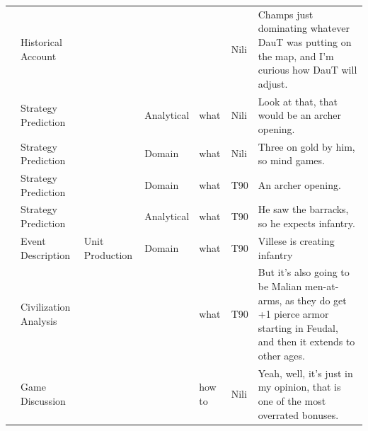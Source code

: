 {\begin{longtable}{@{}>{\theAppRow}r|L{2.3cm}L{2.2cm}L{1.4cm}L{2.2cm}L{0.5cm}U{5.6cm}@{}}
    & Historical Account    &                      &             &                   & Nili    & Champs just dominating whatever DauT was putting on the map, and I'm curious how DauT will adjust.                                                                                                                       \\
    & Strategy Prediction   &                      & Analytical  & what              & Nili    & Look at that, that would be an archer opening.                                                                                                                                                                           \\
    & Strategy Prediction   &                      & Domain      & what              & Nili    & Three on gold by him, so mind games.                                                                                                                                                                                     \\
    & Strategy Prediction   &                      & Domain      & what              & T90     & An archer opening.                                                                                                                                                                                                       \\
    & Strategy Prediction   &                      & Analytical  & what              & T90     & He saw the barracks, so he expects infantry.                                                                                                                                                                             \\
    & Event Description     & Unit Production      & Domain      & what              & T90     & Villese is creating infantry                                                                                                                                                                                             \\
    & Civilization Analysis &                      &             & what              & T90     & But it's also going to be Malian men-at-arms, as they do get +1 pierce armor starting in Feudal, and then it extends to other ages.                                                                                      \\
    & Game Discussion       &                      &             & how to            & Nili    & Yeah, well, it's just in my opinion, that is one of the most overrated bonuses.                                                                                                                                          \\

\end{longtable}}
